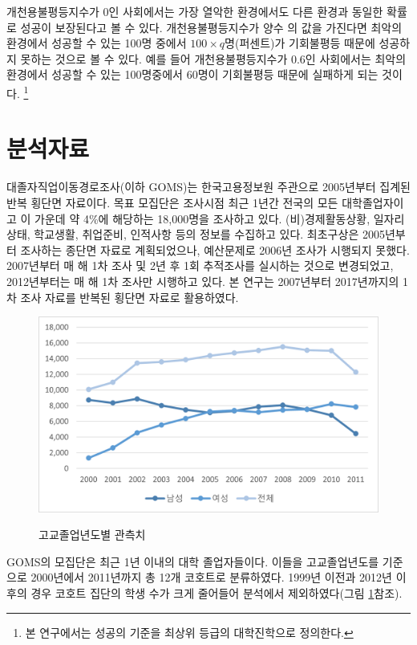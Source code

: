 개천용불평등지수가 0인 사회에서는 가장 열악한 환경에서도 다른 환경과 동일한 확률로 성공이 보장된다고 볼 수 있다.
개천용불평등지수가 양수 의 값을 가진다면 최악의 환경에서 성공할 수 있는 100명 중에서 $100 \times q$명(퍼센트)가 기회불평등 때문에 성공하지 못하는 것으로 볼 수 있다.
예를 들어 개천용불평등지수가 0.6인 사회에서는 최악의 환경에서 성공할 수 있는 100명중에서 60명이 기회불평등 때문에 실패하게 되는 것이다.
\footnote{본 연구에서는 성공의 기준을 최상위 등급의 대학진학으로 정의한다.}


\section{분석자료}
대졸자직업이동경로조사(이하 GOMS)는 한국고용정보원 주관으로 2005년부터 집계된 반복 횡단면 자료이다.
목표 모집단은 조사시점 최근 1년간 전국의 모든 대학졸업자이고 이 가운데 약 4\%에 해당하는 18,000명을 조사하고 있다.
 (비)경제활동상황, 일자리상태, 학교생활, 취업준비, 인적사항 등의 정보를 수집하고 있다.
 최초구상은 2005년부터 조사하는 종단면 자료로 계획되었으나, 예산문제로 2006년 조사가 시행되지 못했다.
 2007년부터 매 해 1차 조사 및 2년 후 1회 추적조사를 실시하는 것으로 변경되었고, 2012년부터는 매 해 1차 조사만 시행하고 있다.
 본 연구는 2007년부터 2017년까지의 1차 조사 자료를 반복된 횡단면 자료로 활용하였다.

\begin{figure}
    \centering
    \caption{고교졸업년도별 관측치}
    \includegraphics[width=\textwidth]{figure/goms_gender.png}
    \label{fig:goms_gender}
\end{figure}

GOMS의 모집단은 최근 1년 이내의 대학 졸업자들이다.
이들을 고교졸업년도를 기준으로 2000년에서 2011년까지 총 12개 코호트로 분류하였다.
 1999년 이전과 2012년 이후의 경우 코호트 집단의 학생 수가 크게 줄어들어 분석에서 제외하였다(그림 \ref{fig:goms_gender}참조).

